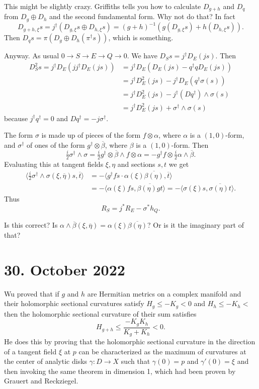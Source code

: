 \documentclass[11pt]{article}
\theoremstyle{definition}
\def\ov#1{\overline{#1}}
\begin{document}
This might be slightly crazy.
Griffiths tells you how to calculate $D_{g+h}$ and $D_q$ from $D_g \oplus D_h$
and the second fundamental form. Why not do that?
In fact
$$
D_{g + h, \xi} s
= j^\dagger (D_{g, \xi} s \oplus D_{h, \xi} s)
= (g+h)^{-1}(g(D_{g, \xi} s) + h(D_{h, \xi} s)).
$$
Then $D_q s = \pi(D_{g} \oplus D_h (\pi^\dagger s))$, which is something.


Anyway.
As usual $0 \to S \to E \to Q \to 0$.
We have $D_S s = j^\dagger D_E(js)$.
Then
\begin{align*}
D^2_S s = j^\dagger D_E(j j^\dagger D_E (js))
&= j^\dagger D_E(D_E(js) - q^\dagger q D_E(js))
\\
&= j^\dagger D^2_E(js) - j^\dagger D_E( q^\dagger \sigma(s))
\\
&= j^\dagger D^2_E(js) - j^\dagger (D q^\dagger) \wedge \sigma(s)
\\
&= j^\dagger D^2_E(js) + \sigma^\dagger \wedge \sigma(s)
\end{align*}
because $j^\dagger q^\dagger = 0$ and $D q^\dagger = -j \sigma^\dagger$.


The form $\sigma$ is made up of pieces of the form $f \otimes \alpha$, where
$\alpha$ is a $(1,0)$-form, and $\sigma^\dagger$ of ones of the form $g^\dagger
\otimes \ov\beta$, where $\beta$ is a $(1,0)$-form. Then
$$
\tfrac i2 \sigma^\dagger \wedge \sigma
= \tfrac i2 g^\dagger \otimes \ov\beta \wedge f \otimes \alpha
= - g^\dagger f \otimes \tfrac i2 \alpha \wedge \ov\beta.
$$
Evaluating this at tangent fields $\xi, \eta$ and sections $s,t$ we get
\begin{align*}
\langle \tfrac i2 \sigma^\dagger \wedge \sigma(\xi, \ov\eta) s, \ov t \rangle
&= -\langle g^\dagger f s \cdot \alpha(\xi) \ov{\beta(\eta)}  , \ov t \rangle
\\
&= - \langle \alpha(\xi) fs, \ov{\beta(\eta) g t} \rangle
= - \langle \sigma(\xi) s, \ov{\sigma(\eta) t} \rangle.
\end{align*}
Thus
$$
R_S = j^*R_E - \sigma^* h_Q.
$$

Is this correct? Is $\alpha \wedge \ov\beta(\xi, \ov\eta) = \alpha(\xi)
\ov{\beta(\eta)}$? Or is it the imaginary part of that?



\section{30. October 2022}

Wu \cite{wu1973remark} proved that if $g$ and $h$ are Hermitian metrics on a
complex manifold and their holomorphic sectional curvatures satisfy $H_g \leq
-K_g < 0$ and $H_h \leq -K_h < $ then the holomorphic sectional curvature of
their sum satisfies
\[
H_{g + h} \leq \frac{-K_g K_h}{K_g + K_h} < 0.
\]
He does this by proving that the holomorphic sectional curvature in the
direction of a tangent field $\xi$ at $p$ can be characterized as the maximum
of curvatures at the center of analytic disks $\gamma : D \to X$ such that
$\gamma(0) = p$ and $\gamma'(0) = \xi$ and then invoking the same theorem in
dimension 1, which had been proven by Grauert and Reckziegel.
\end{document}
